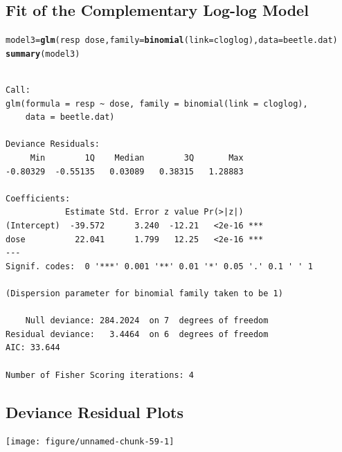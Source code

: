 \documentclass[oneside]{book}\usepackage[]{graphicx}\usepackage[svgnames]{xcolor}
\makeatletter
\newcommand{\hlopt}[1]{\textcolor[rgb]{0,0,0}{#1}}%
\newcommand{\hlstd}[1]{\textcolor[rgb]{0.345,0.345,0.345}{#1}}%
\newcommand{\hlkwb}[1]{\textcolor[rgb]{0.69,0.353,0.396}{#1}}%
\newcommand{\hlkwc}[1]{\textcolor[rgb]{0.333,0.667,0.333}{#1}}%
\newcommand{\hlkwd}[1]{\textcolor[rgb]{0.737,0.353,0.396}{\textbf{#1}}}%
\newenvironment{kframe}{%
 \def\at@end@of@kframe{}%
 \ifinner\ifhmode%
  \def\at@end@of@kframe{\end{minipage}}%
  \begin{minipage}{\columnwidth}%
 \fi\fi%
 \def\FrameCommand##1{\hskip\@totalleftmargin \hskip-\fboxsep
 \colorbox{shadecolor}{##1}\hskip-\fboxsep
     \hskip-\linewidth \hskip-\@totalleftmargin \hskip\columnwidth}%
 \MakeFramed {\advance\hsize-\width
   \@totalleftmargin\z@ \linewidth\hsize
   \@setminipage}}%
 {\par\unskip\endMakeFramed%
 \at@end@of@kframe}
\newenvironment{knitrout}{}{} %
\makeatother
\begin{document}
\subsection*{Fit of the Complementary Log-log Model}
\begin{knitrout}
\color{fgcolor}\begin{kframe}
\begin{alltt}
\hlstd{model3} \hlkwb{=} \hlkwd{glm}\hlstd{(resp} \hlopt{~} \hlstd{dose,} \hlkwc{family} \hlstd{=} \hlkwd{binomial}\hlstd{(}\hlkwc{link} \hlstd{= cloglog),} \hlkwc{data} \hlstd{= beetle.dat)}
\hlkwd{summary}\hlstd{(model3)}
\end{alltt}
\begin{verbatim}

Call:
glm(formula = resp ~ dose, family = binomial(link = cloglog), 
    data = beetle.dat)

Deviance Residuals: 
     Min        1Q    Median        3Q       Max  
-0.80329  -0.55135   0.03089   0.38315   1.28883  

Coefficients:
            Estimate Std. Error z value Pr(>|z|)    
(Intercept)  -39.572      3.240  -12.21   <2e-16 ***
dose          22.041      1.799   12.25   <2e-16 ***
---
Signif. codes:  0 '***' 0.001 '**' 0.01 '*' 0.05 '.' 0.1 ' ' 1

(Dispersion parameter for binomial family taken to be 1)

    Null deviance: 284.2024  on 7  degrees of freedom
Residual deviance:   3.4464  on 6  degrees of freedom
AIC: 33.644

Number of Fisher Scoring iterations: 4
\end{verbatim}
\end{kframe}
\end{knitrout}
\subsection*{Deviance Residual Plots}
\begin{knitrout}
\color{fgcolor}

{\centering \texttt{[image: figure/unnamed-chunk-59-1]} 

}


\end{knitrout}
\end{document}
